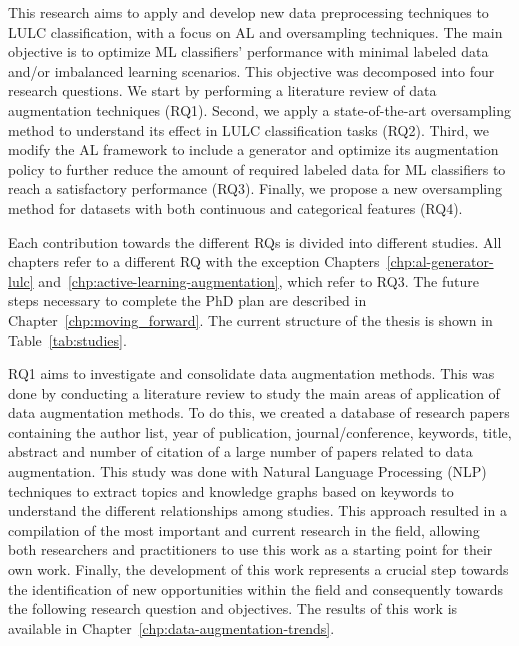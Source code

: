 This research aims to apply and develop new data preprocessing techniques to
LULC classification, with a focus on AL and oversampling techniques. The main
objective is to optimize ML classifiers' performance with minimal labeled data
and/or imbalanced learning scenarios. This objective was decomposed into four
research questions. We start by performing a literature review of data
augmentation techniques (RQ1). Second, we apply a state-of-the-art
oversampling method to understand its effect in LULC classification tasks
(RQ2). Third, we modify the AL framework to include a generator and optimize
its augmentation policy to further reduce the amount of required labeled data
for ML classifiers to reach a satisfactory performance (RQ3). Finally, we
propose a new oversampling method for datasets with both continuous and
categorical features (RQ4).

Each contribution towards the different RQs is divided into different studies.
All chapters refer to a different RQ with the exception
Chapters~\ref{chp:al-generator-lulc}
and~\ref{chp:active-learning-augmentation}, which refer to RQ3. The future
steps necessary to complete the PhD plan are described in
Chapter~\ref{chp:moving_forward}. The current structure of the thesis is shown
in Table~\ref{tab:studies}.

RQ1 aims to investigate and consolidate data augmentation methods. This was
done by conducting a literature review to study the main areas of application
of data augmentation methods. To do this, we created a database of research
papers containing the author list, year of publication, journal/conference,
keywords, title, abstract and number of citation of a large number of papers
related to data augmentation. This study was done with Natural Language
Processing (NLP) techniques to extract topics and knowledge graphs based on
keywords to understand the different relationships among studies. This
approach resulted in  a compilation of the most important and current research
in the field, allowing both researchers and practitioners to use this work as
a starting point for their own work.  Finally, the development of this work
represents a crucial step towards the identification of new opportunities
within the field and consequently towards the following research question and
objectives. The results of this work is available in
Chapter~\ref{chp:data-augmentation-trends}.

